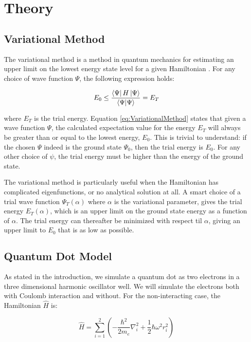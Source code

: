 \documentclass[norsk,a4paper,12pt]{article}
\begin{document}
\section{Theory} \label{Theory}

\subsection{Variational Method} \label{VariationalMethod}
The variational method is a method in quantum mechanics for estimating an upper limit on the lowest energy state level for a given Hamiltonian \cite{Griffiths}. For any choice of wave function $\Psi$, the following expression holds:

\begin{equation}
    E_0 \leq \frac{\bra{\Psi} H \ket{\Psi}}{\bra{\Psi}\ket{\Psi}} = E_T
    \label{eq:VariationalMethod}
\end{equation}

where $E_T$ is the trial energy. 
Equation \ref{eq:VariationalMethod} states that given a wave function $\Psi$, the calculated expectation value for the energy $E_T$ will always be greater than or equal to the lowest energy, $E_0$. This is trivial to understand: if the chosen $\Psi$ indeed is the ground state $\Psi_0$, then the trial energy is $E_0$. For any other choice of $\psi$, the trial  energy must be higher than the energy of the ground state. \par 
The variational method is particularly useful when the Hamiltonian has complicated eigenfunctions, or no analytical solution at all. A smart choice of a trial wave function $\Psi_T(\alpha)$ where $\alpha$ is the variational parameter, gives the trial energy $E_T(\alpha)$, which is an upper limit on the ground state energy as a function of $\alpha$. The trial energy can thereafter be minimized with respect til $\alpha$, giving an upper limit to $E_0$ that is as low as possible.

\subsection{Quantum Dot Model}
As stated in the introduction, we simulate a quantum dot as two electrons in a three dimensional harmonic oscillator well. We will simulate the electrons both with Coulomb interaction and without. For the non-interacting case, the Hamiltonian $\hat{H}$ is:

\begin{equation}
    \hat{H} = \sum_{i=1}^{2} (-\frac{\hbar^2}{2 m_e}\nabla_i^2 + \frac{1}{2}\hbar \omega^2r_i^2) 
    \label{eq:H_non_interaction_unit}
\end{equation}
\end{document}
